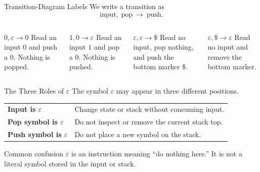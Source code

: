 \documentclass[aspectratio=169,10pt]{beamer}
\newcommand{\eps}{\varepsilon}
\begin{document}
\begin{frame}{Transition-Diagram Labels}
We write a transition as
\[
\boxed{\text{input},\ \text{pop}\ \longrightarrow\ \text{push}}.
\]

\vspace{0.5em}
\begin{columns}[T,onlytextwidth]
\begin{block}{$0,\eps\to 0$}
Read an input $0$ and push a $0$. Nothing is popped.
\end{block}

\begin{block}{$1,0\to\eps$}
Read an input $1$ and pop a $0$. Nothing is pushed.
\end{block}

\begin{block}{$\eps,\eps\to\$$}
Read no input, pop nothing, and push the bottom marker $\$$.
\end{block}

\begin{block}{$\eps,\$\to\eps$}
Read no input and remove the bottom marker.
\end{block}
\end{columns}
\end{frame}

\begin{frame}{The Three Roles of $\eps$}
The symbol $\eps$ may appear in three different positions.

\renewcommand{\arraystretch}{1.35}
\begin{tabular}{>{\bfseries}p{}p{}}
Input is $\eps$ & Change state or stack without consuming input.\\
Pop symbol is $\eps$ & Do not inspect or remove the current stack top.\\
Push symbol is $\eps$ & Do not place a new symbol on the stack.\\
\end{tabular}

\vspace{0.8em}
\begin{alertblock}{Common confusion}
$\eps$ is an instruction meaning ``do nothing here.'' It is not a literal symbol stored in the input or stack.
\end{alertblock}
\end{frame}
\end{document}
